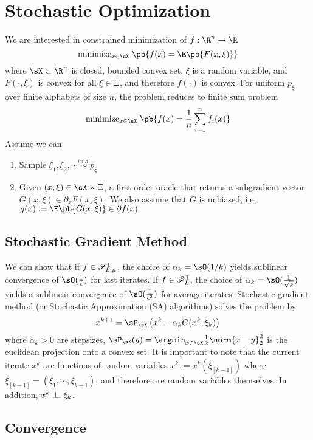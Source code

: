 \documentclass[../summary.tex]{subfiles}
\begin{document}
\section{Stochastic Optimization}
We are interested in constrained minimization of $f:\R^n\to\R$ 
\[
    \text{minimize}_{x\in\sX}\; \pb{
        f(x) = \E\pb{F(x,\xi)}
    }
\]
where $\sX \subset \R^n$ is closed, bounded convex set. $\xi$ is a random variable, and $F(\cdot,\xi)$ is convex for all $\xi\in\Xi$, and therefore $f(\cdot)$ is convex. For uniform $p_{\xi}$ over finite alphabets of size $n$, the problem reduces to finite sum problem
\[
    \text{minimize}_{x\in\sX}\; \pb{
        f(x) = \frac{1}{n} \sum_{i=1}^n f_i(x)
    }    
\] 
Assume we can
\begin{enumerate}
    \item Sample $\xi_1,\xi_2,\cdots \overset{i.i.d.}{\sim} p_{\xi}$
    \item Given $(x,\xi)\in\sX\times\Xi$, a first order oracle that returns a subgradient vector $G(x,\xi) \in\partial_x F(x,\xi)$. We also assume that $G$ is unbiased, i.e. $g(x) := \E\pb{G(x,\xi)}\in\partial f(x)$
\end{enumerate}

\subsection{Stochastic Gradient Method}


We can show that if $f\in\mathscr{S}_{L,\mu}^1$, the choice of $\alpha_k = \sO(1/k)$ yields sublinear convergence of $\sO(\frac{1}{\epsilon})$ for last iterates. If $f\in\mathscr{F}_{L}^1$, the choice of $\alpha_k=\sO(\frac{1}{\sqrt{k}})$ yields a sublinear convergence of $\sO(\frac{1}{\epsilon^2})$ for average iterates. Stochastic gradient method (or Stochastic Approximation (SA) algorithms) solves the problem by 
\[
    x^{k+1} = \sP_{\sX}\left( x^k - \alpha_k G(x^k, \xi_k) \right)    
\]
where $\alpha_k > 0$ are stepsizes, $\sP_{\sX}(y) =  \argmin_{x\in\sX} \frac{1}{2}\norm{x-y}_2^2$ is the euclidean projection onto a convex set. It is important to note that the current iterate $x^k$ are functions of random variables $x^k := x^k(\xi_{[k-1]})$ where $\xi_{[k-1]} = (\xi_1,\cdots,\xi_{k-1})$, and therefore are random variables themselves. In addition, $x^k \perp \!\!\! \perp \xi_k$. 

\subsection{Convergence}
\end{document}
